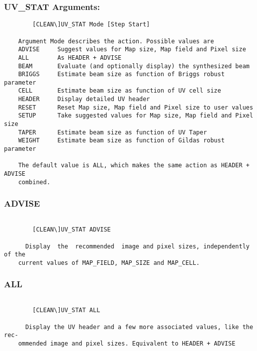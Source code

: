 \subsubsection{UV\_STAT Arguments:}
\begin{verbatim}
        [CLEAN\]UV_STAT Mode [Step Start]

    Argument Mode describes the action. Possible values are
    ADVISE     Suggest values for Map size, Map field and Pixel size
    ALL        As HEADER + ADVISE
    BEAM       Evaluate (and optionally display) the synthesized beam
    BRIGGS     Estimate beam size as function of Briggs robust parameter
    CELL       Estimate beam size as function of UV cell size
    HEADER     Display detailed UV header
    RESET      Reset Map size, Map field and Pixel size to user values
    SETUP      Take suggested values for Map size, Map field and Pixel size
    TAPER      Estimate beam size as function of UV Taper
    WEIGHT     Estimate beam size as function of Gildas robust parameter

    The default value is ALL, which makes the same action as HEADER + ADVISE
    combined.

\end{verbatim}
\subsubsection{ADVISE}
\begin{verbatim}

        [CLEAN\]UV_STAT ADVISE

      Display  the  recommended  image and pixel sizes, independently of the
    current values of MAP_FIELD, MAP_SIZE and MAP_CELL.

\end{verbatim}
\subsubsection{ALL}
\begin{verbatim}

        [CLEAN\]UV_STAT ALL

      Display the UV header and a few more associated values, like the  rec-
    ommended image and pixel sizes. Equivalent to HEADER + ADVISE

\end{verbatim}

